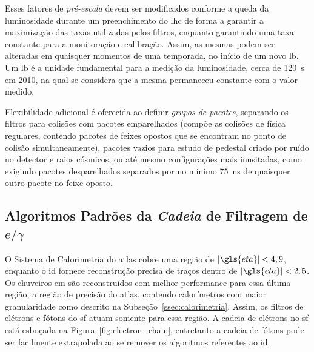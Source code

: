 Esses fatores de \emph{pré-escala} devem ser modificados conforme a queda da
luminosidade durante um preenchimento do \gls{lhc} de forma a garantir a
maximização das taxas utilizadas pelos filtros, enquanto garantindo uma taxa
constante para a monitoração e calibração. Assim, as mesmas podem ser alteradas
em quaisquer momentos de uma temporada, no início de um novo \gls{lb}. Um
\gls{lb} é a unidade fundamental para a medição da luminosidade, cerca de 120~s
em 2010, na qual se considera que a mesma permaneceu constante com o valor
medido.

Flexibilidade adicional é oferecida ao definir \emph{grupos de pacotes}, separando os
filtros para colisões com pacotes emparelhados (compõe as colisões de física
regulares, contendo pacotes de feixes opostos que se encontram no ponto de
colisão simultaneamente), pacotes vazios para estudo de pedestal criado por ruído 
no detector e raios cósmicos, ou até mesmo configurações mais inusitadas, como 
exigindo pacotes desparelhados separados por no mínimo 75~ns de quaisquer outro 
pacote no feixe oposto.



\subsection[Algoritmos Padrões da \emph{Cadeia} de Filtragem de eGamma]{Algoritmos Padrões da \emph{Cadeia} de Filtragem de $e/\gamma$}
\label{ssec:cadeia_egamma}

O Sistema de Calorimetria do \gls{atlas} cobre uma região de $|\gls{eta}| <
4,9$, enquanto o \gls{id} fornece reconstrução precisa de traços dentro de
$|\gls{eta}| < 2,5$. Os chuveiros \gls{em} são reconstruídos com melhor
performance para essa última região, a região de precisão do \gls{atlas}, 
contendo calorímetros com maior granularidade como descrito na
Subseção~\ref{ssec:calorimetria}. Assim, os filtros de elétrons e fótons
\cite{expected_perf_2011,perf_2011} do \gls{sf} atuam somente para essa região.
A cadeia de elétrons no \gls{sf} está esboçada na Figura~\ref{fig:electron_chain}, entretanto
a cadeia de fótons pode ser facilmente extrapolada ao se remover os algoritmos
referentes ao \gls{id}.

